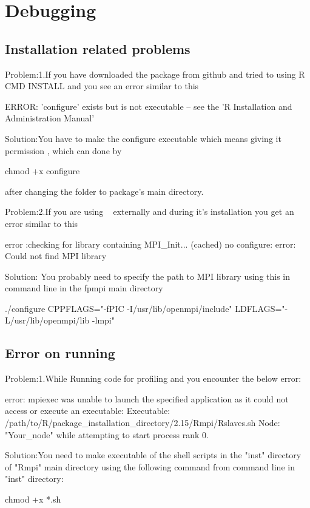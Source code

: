 \section{Debugging }
\label{sec:debug}


\subsection{Installation related problems}

{\color{red}Problem:1.}If you have downloaded the package from github and tried to using R CMD INSTALL  and you see an error similar to this
\begin{Output}
ERROR: 'configure' exists but is not executable -- see the 'R Installation and Administration Manual'
\end{Output}
{\color{dkgreen}Solution:}You have to make the configure executable which means giving it permission , which can done by
\begin{Code}
chmod +x configure
\end{Code}
after changing the folder to package's main directory.

{\color{red}Problem:2.}If you are using ~\citep{fpmpi} externally and during it's installation you get an error similar to this
\begin{Output}
error :checking for library containing MPI_Init... (cached) no configure: 
error: Could not find MPI library
\end{Output}
{\color{dkgreen}Solution:} You probably need to specify the path to MPI library using this in command line in the fpmpi main directory
\begin{Code}
./configure CPPFLAGS="-fPIC -I/usr/lib/openmpi/include" LDFLAGS="-L/usr/lib/openmpi/lib -lmpi"
\end{Code}

\subsection{Error on running}

{\color{red}Problem:1.}While Running  code for profiling and  you encounter the below error:
\begin{Output}
error: mpiexec was unable to launch the specified application as it could not access
or execute an executable:
Executable: /path/to/R/package_installation_directory/2.15/Rmpi/Rslaves.sh
Node: "Your_node"
while attempting to start process rank 0.
\end{Output}
{\color{dkgreen}Solution:}You need to make executable of the shell scripts in the "inst" directory of "Rmpi" main directory using the following command from command line in "inst" directory:
\begin{Code}
chmod +x *.sh
\end{Code}

